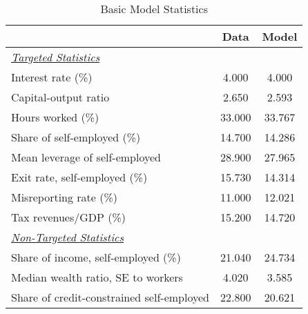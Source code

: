 \documentclass[a4paper,10pt]{article}
\begin{document}
 
\begin{table}[tbp] 
\caption{Basic Model Statistics \label{tab:model_fit}} 
\begin{center} 
\begin{tabular}{lcc} 
\hline 
      & Data  & Model \\ 
\hline 
\hline 
\textit{\underline{Targeted Statistics}} &       &      \\  
Interest rate (\%)                  &    4.000 &    4.000 \\ 
Capital-output ratio                  &    2.650 &    2.593 \\ 
Hours worked (\%)                   &   33.000 &   33.767 \\ 
Share of self-employed (\%)         &   14.700 &   14.286 \\ 
Mean leverage of self-employed        &   28.900 &   27.965 \\ 
Exit rate, self-employed  (\%)      &   15.730 &   14.314 \\ 
Misreporting rate   (\%)            &   11.000 &   12.021 \\ 
Tax revenues/GDP    (\%)            &   15.200 &   14.720 \\ 
\textit{\underline{Non-Targeted Statistics}} &       &      \\  
Share of income, self-employed (\%)           &   21.040 &   24.734 \\ 
Median wealth ratio, SE to workers              &    4.020 &    3.585 \\ 
Share of credit-constrained self-employed       &   22.800 &   20.621 \\ 
\hline 
\end{tabular} 
\end{center} 
\end{table} 
\end{document}
